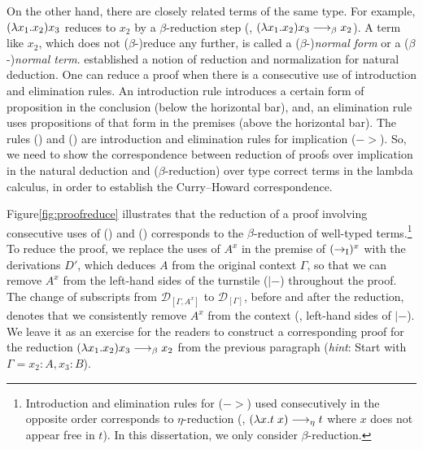 On the other hand, there are closely related terms of the same type.
For example, $(\lambda x_1.x_2) x_3$ reduces to $x_2$ by a $\beta$-reduction step
(\ie, $(\lambda x_1.x_2) x_3 -->_\beta x_2$). A term like $x_2$, which does not
($\beta$-)reduce any further, is called a ($\beta$-)\emph{normal form} or
a ($\beta$-)\emph{normal term}. \citet{Pra65} established a notion of
reduction and normalization for natural deduction. One can reduce a proof
when there is a consecutive use of introduction and elimination rules.
An introduction rule introduces a certain form of proposition
in the conclusion (below the horizontal bar), and, an elimination rule
uses propositions of that form in the premises (above the horizontal bar).
The rules () and ()
are introduction and elimination rules for implication ($->$).
So, we need to show the correspondence between reduction of proofs
over implication in the natural deduction and ($\beta$-reduction) over
type correct terms in the lambda calculus,
in order to establish the Curry--Howard correspondence.

Figure\;\ref{fig:proofreduce} illustrates that
the reduction of a proof involving consecutive uses of
() and ()
corresponds to the $\beta$-reduction of well-typed terms.\footnote{
        Introduction and elimination rules for ($->$) used consecutively
        in the opposite order corresponds to $\eta$-reduction
        (\ie, $(\lambda x. t\;x) -->_\eta t$ where $x$ does not appear free in $t$).
        In this dissertation, we only consider $\beta$-reduction.}
To reduce the proof, we replace the uses of $A^x$ in the premise of
$(->_\textsc{I})^x$ with the derivations $D'$, which deduces $A$ from
the original context $\Gamma$, so that we can remove $A^x$ from
the left-hand sides of the turnstile ($|-$) throughout the proof.
The change of subscripts from $\mathcal{D}_{[\Gamma,A^x]}$ to
$\mathcal{D}_{[\Gamma]}$, before and after the reduction,
denotes that we consistently remove $A^x$ from the context
(\ie, left-hand sides of $|-$). We leave it as an exercise for
the readers to construct a corresponding proof for the reduction
$(\lambda x_1.x_2) x_3 -->_\beta x_2$ from the previous paragraph
(\textit{hint}: Start with $\Gamma = x_2:A,x_3:B$).

